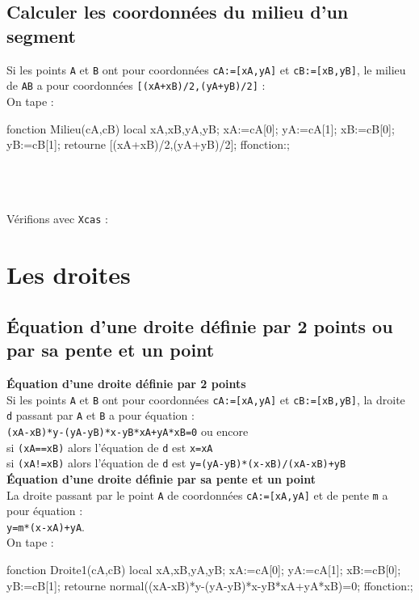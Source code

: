 \documentclass[12pt,a4paper]{book}
\begin{document}
\begin{giacjshere}
\subsection{Calculer les coordonn\'ees du milieu d'un segment}\label{sec:Milieu}
Si les points {\tt A} et {\tt B} ont pour coordonn\'ees {\tt cA:=[xA,yA]} et 
{\tt cB:=[xB,yB]}, le milieu de {\tt AB} a pour coordonn\'ees 
{\tt [(xA+xB)/2,(yA+yB)/2]} :\\
On tape :
\begin{giaconload}
fonction Milieu(cA,cB)
 local xA,xB,yA,yB;
 xA:=cA[0];
 yA:=cA[1];
 xB:=cB[0];
 yB:=cB[1];
 retourne [(xA+xB)/2,(yA+yB)/2];
ffonction:;
\end{giaconload}
\\
\\
\\
V\'erifions  avec {\tt Xcas} :\\
\section{Les droites}
\subsection{\'Equation d'une droite d\'efinie par 2 points ou par sa pente et un point}\label{sec:Droite}
{\bf \'Equation d'une droite d\'efinie par 2 points}\\
Si les points {\tt A} et {\tt B} ont pour coordonn\'ees {\tt cA:=[xA,yA]} et 
{\tt cB:=[xB,yB]}, la droite {\tt d} passant par {\tt A} et {\tt B} a pour 
\'equation :\\
{\tt (xA-xB)*y-(yA-yB)*x-yB*xA+yA*xB=0} ou encore\\
si {\tt (xA==xB)} alors l'\'equation de {\tt d} est {\tt x=xA} \\
si {\tt (xA!=xB)} alors l'\'equation de {\tt d} est 
{\tt y=(yA-yB)*(x-xB)/(xA-xB)+yB} \\

{\bf \'Equation d'une droite d\'efinie par sa pente et un point}\\
La droite passant par le point {\tt A} de coordonn\'ees 
{\tt cA:=[xA,yA]} et de pente {\tt m} a pour \'equation :\\
{\tt y=m*(x-xA)+yA}.\\
On tape :
\begin{giacprog}
fonction Droite1(cA,cB)
 local xA,xB,yA,yB;
 xA:=cA[0];
 yA:=cA[1];
 xB:=cB[0];
 yB:=cB[1];
 retourne normal((xA-xB)*y-(yA-yB)*x-yB*xA+yA*xB)=0;
ffonction:;


\end{giacprog}
\end{giacjshere}
\end{document}
